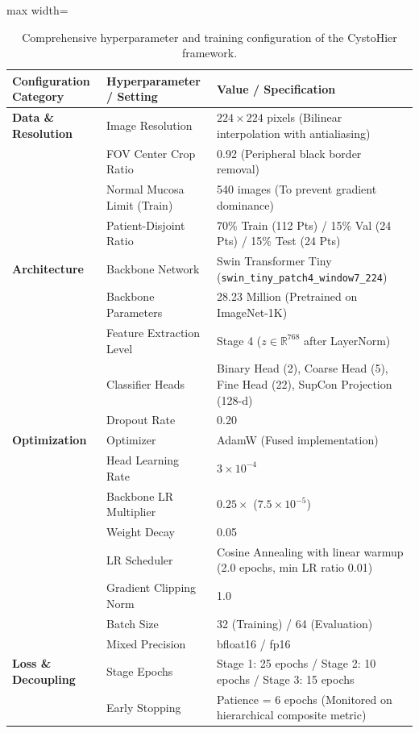\documentclass[runningheads]{llncs}
\begin{document}
\begin{table}[t]
\centering
\caption{Comprehensive hyperparameter and training configuration of the CystoHier framework.}
\label{tab:hyperparameters}
\begin{adjustbox}{max width=\textwidth}
\begin{tabular}{lll}
\toprule
\textbf{Configuration Category} & \textbf{Hyperparameter / Setting} & \textbf{Value / Specification} \\
\midrule
\textbf{Data \& Resolution} & Image Resolution & $224 \times 224$ pixels (Bilinear interpolation with antialiasing) \\
 & FOV Center Crop Ratio & 0.92 (Peripheral black border removal) \\
 & Normal Mucosa Limit (Train) & 540 images (To prevent gradient dominance) \\
 & Patient-Disjoint Ratio & 70\% Train (112 Pts) / 15\% Val (24 Pts) / 15\% Test (24 Pts) \\
\midrule
\textbf{Architecture} & Backbone Network & Swin Transformer Tiny (\texttt{swin\_tiny\_patch4\_window7\_224}) \\
 & Backbone Parameters & 28.23 Million (Pretrained on ImageNet-1K) \\
 & Feature Extraction Level & Stage 4 ($z \in \mathbb{R}^{768}$ after LayerNorm) \\
 & Classifier Heads & Binary Head (2), Coarse Head (5), Fine Head (22), SupCon Projection (128-d) \\
 & Dropout Rate & 0.20 \\
\midrule
\textbf{Optimization} & Optimizer & AdamW (Fused implementation) \\
 & Head Learning Rate & $3 \times 10^{-4}$ \\
 & Backbone LR Multiplier & $0.25 \times$ ($7.5 \times 10^{-5}$) \\
 & Weight Decay & 0.05 \\
 & LR Scheduler & Cosine Annealing with linear warmup (2.0 epochs, min LR ratio 0.01) \\
 & Gradient Clipping Norm & 1.0 \\
 & Batch Size & 32 (Training) / 64 (Evaluation) \\
 & Mixed Precision & bfloat16 / fp16 \\
\midrule
\textbf{Loss \& Decoupling} & Stage Epochs & Stage 1: 25 epochs / Stage 2: 10 epochs / Stage 3: 15 epochs \\
 & Early Stopping & Patience = 6 epochs (Monitored on hierarchical composite metric) \\

\end{tabular}
\end{adjustbox}
\end{table}
\end{document}

